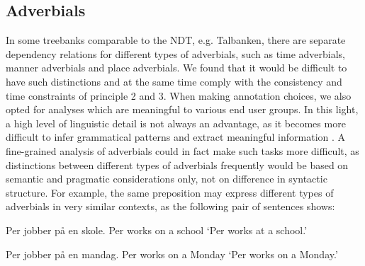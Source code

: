 \documentclass[10pt,a4paper]{article}
\begin{document}
\subsection{Adverbials}
In some treebanks comparable to the NDT, e.g. Talbanken, there are separate dependency relations for different types of adverbials, such as time adverbials, manner adverbials and place adverbials. 
We found that it would be difficult to have such distinctions and at the same time comply with the consistency and time constraints of principle 2 and 3. %
When making annotation choices, we also opted for analyses which are meaningful to various end user groups.
In this light, a high level of linguistic detail is not always an advantage, as it becomes more difficult to infer grammatical patterns and extract meaningful information \cite{Mar:Man:08}.
A fine-grained analysis of adverbials could in fact make such tasks more difficult, as distinctions between different types of adverbials frequently would be based on semantic and pragmatic considerations only, not on difference in syntactic structure.
For example, the same preposition may express different types of adverbials in very similar contexts, as the following pair of sentences shows:

\begin{examples}
\item\label{ex:locadv}
\gll Per jobber på en skole.
Per works on a school
\glt `Per works at a school.'
\glend

\item\label{ex:timeadv}
\gll Per jobber på en mandag.
Per works on a Monday
\glt `Per works on a Monday.'
\glend
\end{examples}
\end{document}
